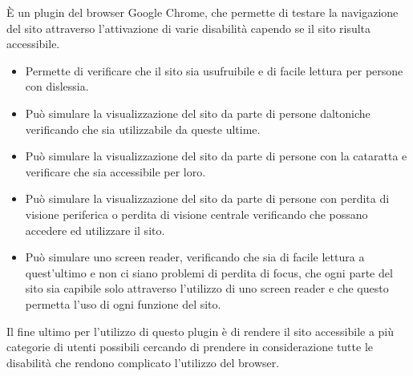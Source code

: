 È un plugin del browser Google Chrome, che permette di testare la navigazione del sito attraverso l'attivazione di varie disabilità capendo se il sito risulta accessibile.
\begin{itemize}
	\item Permette di verificare che il sito sia usufruibile e di facile 	lettura per persone con dislessia.\\
	\item Può simulare la visualizzazione del sito da parte di persone daltoniche verificando che sia utilizzabile da queste ultime.\\
	\item Può simulare la visualizzazione del sito da parte di persone con la cataratta e verificare che sia accessibile per loro.
	\item Può simulare la visualizzazione del sito da parte di persone con perdita di visione periferica o perdita di visione centrale verificando che possano accedere ed utilizzare il sito.
	\item Può simulare uno screen reader, verificando che sia di facile lettura a quest'ultimo e non ci siano problemi di perdita di focus, che ogni parte del sito sia capibile solo attraverso l'utilizzo di uno screen reader e che questo permetta l'uso di ogni funzione del sito.
\end{itemize}
Il fine ultimo per l'utilizzo di questo plugin è di rendere il sito accessibile a più categorie di utenti possibili cercando di prendere in considerazione tutte le disabilità che rendono complicato l'utilizzo del browser.\\